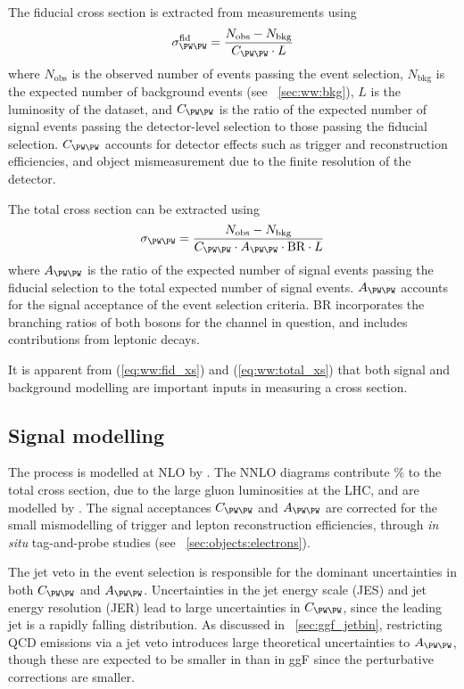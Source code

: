 The fiducial cross section is extracted from measurements using
\begin{equation}
	\sigma_{\WW}^{\text{fid}} = \frac{N_{\text{obs}} - N_{\text{bkg}}}{C_{\WW} \cdot L}
	\label{eq:ww:fid_xs}
\end{equation}
where $N_{\text{obs}}$ is the observed number of events passing the event selection, 
$N_{\text{bkg}}$ is the expected number of background events (see 
\Section~\ref{sec:ww:bkg}), $L$ is the luminosity of the dataset, and $C_{\WW}$ is the 
ratio of the expected number of signal events passing the detector-level selection to 
those passing the fiducial selection. $C_{\WW}$ accounts for detector effects such as 
trigger and reconstruction efficiencies, and object mismeasurement due to the 
finite resolution of the detector.

The total cross section can be extracted using
\begin{equation}
	\sigma_{\WW} = \frac{N_{\text{obs}} - N_{\text{bkg}}}{C_{\WW} \cdot A_{\WW} \cdot \text{BR} \cdot L}
	\label{eq:ww:total_xs}
\end{equation}
where $A_{\WW}$ is the ratio of the expected number of signal events passing the fiducial 
selection to the total expected number of signal events. $A_{\WW}$ accounts for the 
signal acceptance of the event selection criteria. BR incorporates the branching ratios 
of both \PW bosons for the channel in question, and includes contributions from leptonic 
\Ptau decays.

It is apparent from (\ref{eq:ww:fid_xs}) and (\ref{eq:ww:total_xs}) that both signal and 
background modelling are important inputs in measuring a cross section.



\subsection{Signal modelling}
\label{sec:ww:signal}

The \WW process is modelled at NLO by \meps{\mcatnlo}{\fherwig}. The NNLO \ggWW diagrams 
contribute \% to the total cross section, due to the large gluon luminosities at 
the LHC, and are modelled by \meps{\ggtoww}{\fherwig} \cite{gg2ww}. The signal 
acceptances $C_{\WW}$ and $A_{\WW}$ are corrected for the small mismodelling of trigger and 
lepton reconstruction efficiencies, through \textit{in situ} tag-and-probe studies (see 
\Section~\ref{sec:objects:electrons}).

The jet veto in the event selection is responsible for the dominant uncertainties in both 
$C_{\WW}$ and $A_{\WW}$. Uncertainties in the jet energy scale (JES) and jet energy 
resolution (JER) lead to large uncertainties in $C_{\WW}$, since the leading jet \pt is a 
rapidly falling distribution. As discussed in \Section~\ref{sec:ggf_jetbin}, restricting 
QCD emissions via a jet veto introduces large theoretical uncertainties to $A_{\WW}$, 
though these are expected to be smaller in \WW than in ggF since the perturbative 
corrections are smaller.

